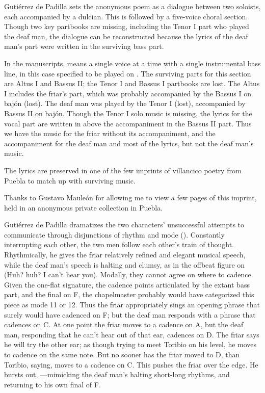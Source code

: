 Gutiérrez de Padilla sets the anonymous poem as a dialogue between two soloists,
each accompanied by a dulcian.
This is followed by a five-voice choral section.
Though two key partbooks are missing, including the Tenor I part who played the
deaf man, the dialogue can be reconstructed because the lyrics of the deaf man's
part were written in the surviving bass part.%
\begin{Footnote}
    In the manuscripts,  means a single voice at a time with a single
    instrumental bass line, in this case specified to be played on .  
    The surviving parts for this section are Altus I and Bassus II; the Tenor I
    and Bassus I partbooks are lost.
    The Altus I includes the friar's part, which was probably accompanied by the
    Bassus I on bajón (lost).  
    The deaf man was played by the Tenor I (lost), accompanied by Bassus II on
    bajón.
    Though the Tenor I solo music is missing, the lyrics for the vocal part are
    written in above the accompaniment in the Bassus II part.  
    Thus we have the music for the friar without its accompaniment, and the
    accompaniment for the deaf man and most of the lyrics, but not the deaf
    man's music.
\end{Footnote}
The lyrics are preserved in one of the few imprints of villancico poetry from
Puebla to match up with surviving music.%
\begin{Footnote}
    Thanks to Gustavo Mauleón for allowing me to view a few pages of this
    imprint, held in an anonymous private collection in Puebla.
\end{Footnote}
Gutiérrez de Padilla dramatizes the two characters' unsuccessful attempts to
communicate through disjunctions of rhythm and mode
().
Constantly interrupting each other, the two men follow each other's train of
thought.
Rhythmically, he gives the friar relatively refined and elegant musical speech,
while the deaf man's speech is halting and clumsy, as in the offbeat figure on
 (Huh? huh? I can't hear you).
Modally, they cannot agree on where to cadence.
Given the one-flat  signature, the cadence points
articulated by the extant bass part, and the final on F, the chapelmaster
probably would have categorized this piece as mode 11 or 12.%
    \Autocites
    [873--882]{Cerone:Melopeo} 
    {Judd:RenaissanceModalTheory}
    {Barnett:TonalOrganization17C}  
Thus the friar appropriately sings an opening phrase that surely would have
cadenced on F; but the deaf man responds with a phrase that cadences on C.
At one point the friar moves to a cadence on A, but the deaf man, responding
that he can't hear out of that ear, cadences on D. 
The friar says he will try the other ear; as though trying to meet Toribio on
his level, he moves to cadence on the same note.
But no sooner has the friar moved to D, than Toribio, saying,  moves to a cadence on C.  
This pushes the friar over the edge.
He bursts out, ---mimicking the deaf man's
halting short-long rhythms, and returning to his own final of F.


